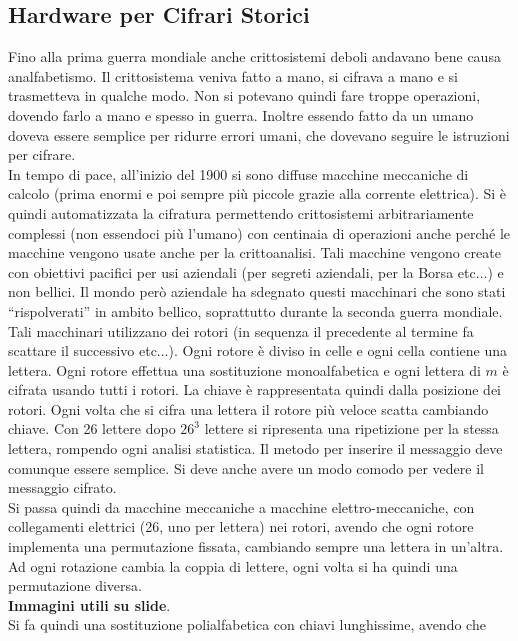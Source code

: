 \documentclass[a4paper,12pt, oneside]{book}
\begin{document}
\subsection{Hardware per Cifrari Storici}
Fino alla prima guerra mondiale anche crittosistemi deboli andavano bene causa
analfabetismo. Il crittosistema veniva fatto a mano, si cifrava a mano e si
trasmetteva in qualche modo. Non si potevano quindi fare troppe operazioni,
dovendo farlo a mano e spesso in guerra. Inoltre essendo fatto da un umano
doveva essere semplice per ridurre errori umani, che dovevano seguire le
istruzioni per cifrare.\\
In tempo di pace, all'inizio del 1900 si sono diffuse macchine meccaniche di
calcolo (prima enormi e poi sempre più piccole grazie alla corrente
elettrica). Si è quindi automatizzata la cifratura permettendo crittosistemi
arbitrariamente complessi (non essendoci più l'umano) con centinaia di
operazioni anche perché le macchine vengono usate anche per la crittoanalisi.
Tali macchine vengono create con obiettivi pacifici per usi aziendali (per
segreti aziendali, per la Borsa etc$\ldots$) e non bellici. Il mondo però
aziendale ha sdegnato questi macchinari che sono stati ``rispolverati'' in
ambito bellico, soprattutto durante la seconda guerra mondiale.\\
Tali macchinari utilizzano dei rotori (in sequenza il precedente al termine fa
scattare il successivo etc$\ldots$). Ogni rotore è diviso in celle e ogni cella
contiene una lettera. Ogni rotore effettua una sostituzione monoalfabetica e
ogni lettera di $m$ è cifrata usando tutti i rotori. La chiave è rappresentata
quindi dalla posizione dei rotori. Ogni volta che si cifra una
lettera il rotore più veloce scatta cambiando chiave. Con 26 lettere dopo $26^3$
lettere si ripresenta una ripetizione per la stessa lettera, rompendo ogni
analisi statistica. Il metodo per inserire il messaggio deve comunque essere
semplice. Si deve anche avere un modo comodo per vedere il messaggio cifrato.\\
Si passa quindi da macchine meccaniche a macchine elettro-meccaniche, con
collegamenti elettrici (26, uno per lettera) nei rotori, avendo che ogni rotore
implementa una permutazione fissata, cambiando sempre una lettera in
un'altra. Ad ogni rotazione cambia la coppia di lettere, ogni volta si ha quindi
una permutazione diversa.\\
\textbf{Immagini utili su slide}.\\
Si fa quindi una sostituzione polialfabetica con chiavi lunghissime, avendo che
\end{document}

